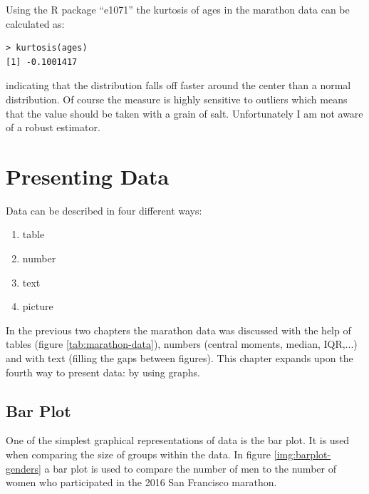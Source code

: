 \documentclass{tufte-book} %
\begin{document}
Using the R package ``e1071'' the kurtosis of ages in the marathon data can be calculated as:

\begin{Verbatim}
> kurtosis(ages)
[1] -0.1001417
\end{Verbatim}

indicating that the distribution falls off faster around the center than a normal distribution. Of course the measure is highly sensitive to outliers which means that the value should be taken with a grain of salt. Unfortunately I am not aware of a robust estimator.


\chapter{Presenting Data}
\label{ch:presenting-data}
Data can be described in four different ways: 

\begin{enumerate}
	\item table
	\item number
	\item text
	\item picture
\end{enumerate}

In the previous two chapters the marathon data was discussed with the help of tables (figure \ref{tab:marathon-data}), numbers (central moments, median, IQR,...) and with text (filling the gaps between figures). This chapter expands upon the fourth way to present data: by using graphs.

\section{Bar Plot}
One of the simplest graphical representations of data is the bar plot. It is used when comparing the size of groups within the data. In figure \ref{img:barplot-genders} a bar plot is used to compare the number of men to the number of women who participated in the 2016 San Francisco marathon. 
\end{document}

